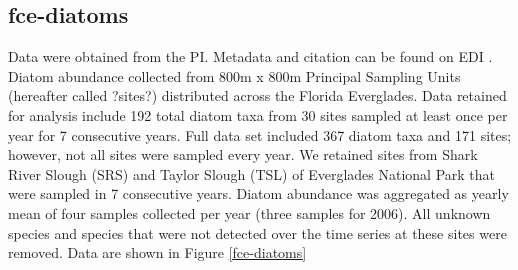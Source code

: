 \documentclass[11pt, oneside]{article}
\begin{document}
\subsection {fce-diatoms}
Data were obtained from the PI.
Metadata and citation can be found on EDI \citep{fce-diatoms}.
Diatom abundance collected from 800m x 800m Principal Sampling Units (hereafter called ?sites?) distributed across the Florida Everglades. 
Data retained for analysis include 192 total diatom taxa from 30 sites sampled at least once per year for 7 consecutive years. 
Full data set included 367 diatom taxa and 171 sites; however, not all sites were sampled every year. 
We retained sites from Shark River Slough (SRS) and Taylor Slough (TSL) of Everglades National Park that were sampled in 7 consecutive years. 
Diatom abundance was aggregated as yearly mean of four samples collected per year (three samples for 2006). 
All unknown species and species that were not detected over the time series at these sites were removed.
Data are shown in Figure \ref{fce-diatoms}
\end{document}
